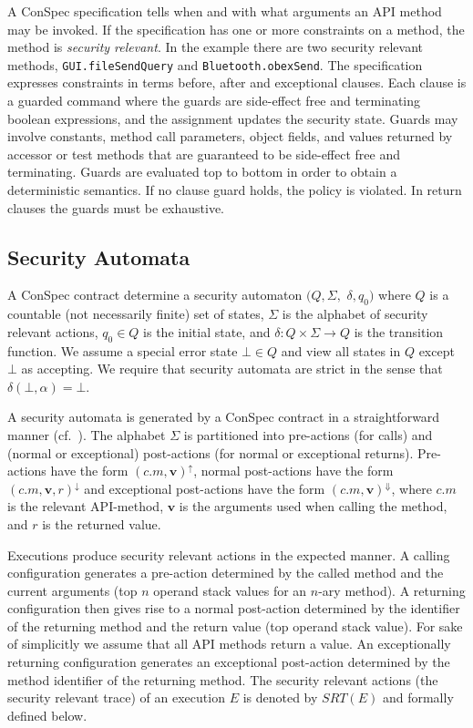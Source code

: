 \documentclass[10pt,twocolumn]{article}
\newcommand{\SRT}{\mathit{SRT}}
\begin{document}
A ConSpec specification tells when and with what arguments an API method 
may be invoked. If the specification has one or more constraints on a 
method, the method is \emph{security relevant}. In 
the example there are two security relevant methods, 
{\tt GUI\!.fileSendQuery} and {\tt Bluetooth\!.\!obexSend}. The specification 
expresses constraints in terms 
{\sc before}, {\sc after} and {\sc exceptional} clauses. Each clause is 
a guarded command where the guards are side-effect free and terminating 
boolean expressions, and the assignment updates the security state. 
Guards may involve constants, method call parameters, object fields, 
and values returned by accessor or test methods that are guaranteed to 
be side-effect free and terminating. Guards are evaluated top to bottom 
in order to obtain a deterministic semantics. If no clause guard holds, 
the policy is violated. In return clauses the guards must be 
exhaustive.


\subsection{Security Automata}
A ConSpec contract determine a security automaton $(Q,\Sigma,$ $\delta, q_0)$ where $Q$ is a countable (not necessarily finite) 
set of states, $\Sigma$ is the alphabet of security relevant actions, 
$q_0\in Q$ is the initial state, and $\delta:Q\times \Sigma \rightarrow Q$ 
is the transition function. We assume a special error state $\bot\in Q$
and view all states in $Q$ except $\bot$ as accepting. We require that
security automata are strict in the sense that $\delta(\bot,\alpha)=\bot$.

A security automata is generated by a ConSpec contract in a straightforward manner (cf.~\cite{AktDamGur08}). The alphabet $\Sigma$ is partitioned into 
pre-actions (for calls) and (normal or exceptional) post-actions 
(for normal or exceptional returns). Pre-actions have the form 
$(c.m, \mathbf{v})^\uparrow$, normal post-actions have the form 
$(c.m, \mathbf{v}, r)^\downarrow$ and exceptional post-actions have 
the form $(c.m, \mathbf{v})^\Downarrow$, where $c.m$ is the 
relevant API-method, $\mathbf{v}$ is the arguments used when 
calling the method, and $r$ is the returned value.

Executions produce security relevant actions in the expected manner.
A calling configuration generates a pre-action determined 
by the called method and the current arguments (top $n$ operand stack 
values for an $n$-ary method). A returning configuration then gives 
rise to a normal post-action determined by the identifier of the 
returning method and the return value (top operand stack value). 
For sake of simplicitly we assume that all API methods return a value. 
An exceptionally returning configuration generates an exceptional 
post-action determined by the method identifier of the returning method. 
The security relevant actions (the security relevant trace) of an 
execution $E$ is denoted by $\SRT(E)$ and formally defined below.
\end{document}
